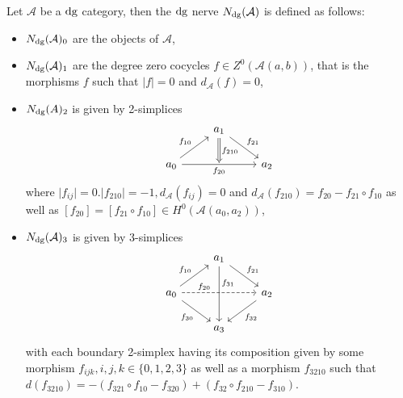 \begin{construction}
\label{dg-nerve_defi}
	Let $ \mathcal{ A } $ be a $ \operatorname{dg} $ category, then the $ \operatorname{dg} $ nerve $ N_{ \operatorname{dg} } ( \mathcal{ A } ) $ is defined as follows:
	\begin{itemize}
		\item 
		$ N_{ \operatorname{dg} } ( \mathcal{ A } )_0 $ are the objects of $ \mathcal{ A } $,
		
		\item 
		$ N_{ \operatorname{dg} } ( \mathcal{ A } )_1 $ are the degree zero cocycles $ f \in Z^0 ( \mathcal{ A } ( a , b ) ) $, that is the morphisms $ f $ such that $ \lvert f \rvert = 0 $ and $ d_{ \mathcal{ A } } ( f ) = 0 $,
		
		\item 
		$ N_{ \operatorname{dg} } ( A )_2 $ is given by 2-simplices
		\[
		\begin{tikzcd}
			&
			a_1
			\ar[d, Rightarrow, "{f_{ 2 1 0 }}"]
			\ar[rd, "f_{ 2 1 }" ]
			\\
			a_0
			\ar[ru, " f_{ 1 0 } "]
			\ar[rr, "f_{ 2 0 } "']
			&
			{}
			&
			a_2
		\end{tikzcd}
		\]
		where $ \lvert f_{ i j } \rvert = 0 . \lvert f_{ 2 1 0 } \rvert = - 1 , d_{ \mathcal{ A } } ( f_{ i j } ) = 0 $ and $ d_\mathcal{ A } ( f_{ 2 1 0 } ) = f_{ 2 0 } - f_{ 2 1 } \circ f_{ 1 0 } $ as well as $ [ f_{ 2 0 } ] = [ f_{ 2 1 } \circ f_{ 1 0 } ] \in H^0 ( \mathcal{ A } ( a_0 , a_2 ) )$,
		
		\item 
		$ N_{ \operatorname{dg} } ( \mathcal{ A } )_3 $ is given by 3-simplices 
		\[
		\begin{tikzcd}
			& 
			a_1
			\ar[dd, " f_{ 3 1 } " pos=0.3]
			\ar[rd, " f_{ 2 1 } "]
			\\
			a_0 
			\ar[ru," f_{ 1 0 } "]
			\ar[rd," f_{ 3 0 } "']
			\ar[rr, dashed, "f_{ 2 0 }" pos=0.3]
			&&
			a_2
			\ar[dl, " f_{ 32 } "]
			\\
			&
			a_3
		\end{tikzcd}
		\]
		with each boundary 2-simplex having its composition given by some morphism $ f_{ i j k } , i, j , k \in \{ 0 ,1 , 2 , 3 \} $ as well as a morphism $ f_{ 3 2 1 0 } $ such that 
		$ d ( f_{ 3 2 1 0 } ) = - ( f_{ 3 2 1 } \circ f_{ 1 0 } - f_{ 3 2 0 } ) + ( f_{ 3 2 } \circ f_{ 2 1 0 } - f_{ 3 1 0 } ) $.
	\end{itemize} 
\end{construction}


